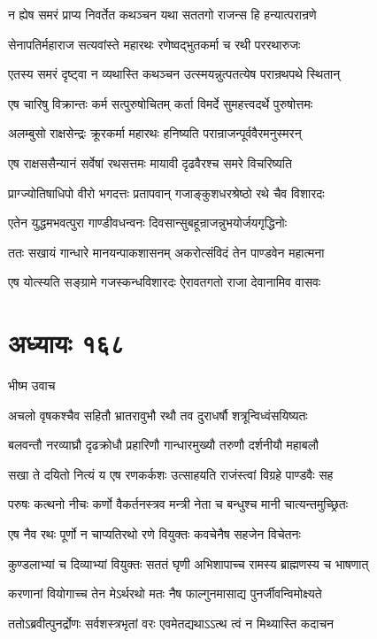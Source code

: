 \twolineshloka
{न ह्येष समरं प्राप्य निवर्तेत कथञ्चन}
{यथा सततगो राजन्स हि हन्यात्परान्रणे}


\twolineshloka
{सेनापतिर्महाराज सत्यवांस्ते महारथः}
{रणेष्वद्भुतकर्मा च रथी पररथारुजः}


\twolineshloka
{एतस्य समरं दृष्ट्वा न व्यथास्ति कथञ्चन}
{उत्स्मयन्नुत्पतत्येष परान्रथपथे स्थितान्}


\twolineshloka
{एष चारिषु विक्रान्तः कर्म सत्पुरुषोचितम्}
{कर्ता विमर्दे सुमहत्त्वदर्थे पुरुषोत्तमः}


\twolineshloka
{अलम्बुसो राक्षसेन्द्रः क्रूरकर्मा महारथः}
{हनिष्यति परान्राजन्पूर्ववैरमनुस्मरन्}


\twolineshloka
{एष राक्षससैन्यानं सर्वेषां रथसत्तमः}
{मायावी दृढवैरश्च समरे विचरिष्यति}


\twolineshloka
{प्राग्ज्योतिषाधिपो वीरो भगदत्तः प्रतापवान्}
{गजाङ्कुशधरश्रेष्ठो रथे चैव विशारदः}


\twolineshloka
{एतेन युद्धमभवत्पुरा गाण्डीवधन्वनः}
{दिवसान्सुबहून्राजन्नुभयोर्जयगृद्धिनोः}


\twolineshloka
{ततः सखायं गान्धारे मानयन्पाकशासनम्}
{अकरोत्संविदं तेन पाण्डवेन महात्मना}


\twolineshloka
{एष योत्स्यति सङ्ग्रामे गजस्कन्धविशारदः}
{ऐरावतगतो राजा देवानामिव वासवः}


\chapter{अध्यायः १६८}
\twolineshloka
{भीष्म उवाच}
{}


\twolineshloka
{अचलो वृषकश्चैव सहितौ भ्रातरावुभौ}
{रथौ तव दुराधर्षौ शत्रून्विध्वंसयिष्यतः}


\twolineshloka
{बलवन्तौ नरव्याघ्रौ दृढक्रोधौ प्रहारिणौ}
{गान्धारमुख्यौ तरुणौ दर्शनीयौ महाबलौ}


\twolineshloka
{सखा ते दयितो नित्यं य एष रणकर्कशः}
{उत्साहयति राजंस्त्वां विग्रहे पाण्डवैः सह}


\twolineshloka
{परुषः कत्थनो नीचः कर्णो वैकर्तनस्त्रव}
{मन्त्री नेता च बन्धुश्च मानी चात्यन्तमुच्छ्रितः}


\twolineshloka
{एष नैव रथः पूर्णो न चाप्यतिरथो रणे}
{वियुक्तः कवचेनैष सहजेन विचेतनः}


\twolineshloka
{कुण्डलाभ्यां च दिव्याभ्यां वियुक्तः सततं घृणी}
{अभिशापाच्च रामस्य ब्राह्मणस्य च भाषणात्}


\twolineshloka
{करणानां वियोगाच्च तेन मेऽर्थरथो मतः}
{नैष फाल्गुनमासाद्य पुनर्जीवन्विमोक्ष्यते}


\twolineshloka
{ततोऽब्रवीत्पुनर्द्रोणः सर्वशस्त्रभृतां वरः}
{एवमेतद्यथाऽऽत्थ त्वं न मिथ्यास्ति कदाचन}


